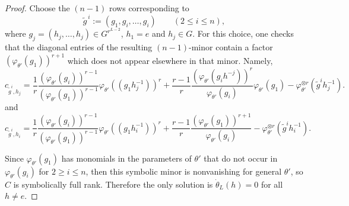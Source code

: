 \documentclass[10pt,a4paper]{amsart}
\begin{document}
\begin{proof}
Choose the $(n-1)$ rows corresponding to
\[
\tilde g^{\,i}:=(g_1, g_i,\dots,g_i)\qquad(2\le i\le n),
\]
where $g_j=(h_j,\dots,h_j)\in G^{r^{L-2}}$, $h_1=e$ and $h_j \in G$. For this choice, one checks that the diagonal entries of the resulting $(n-1)$-minor contain a factor $(\varphi_{\theta'}(g_1))^{r+1}$ which does not appear elsewhere in that minor. 
Namely,
 \[
 c_{\tilde{g}^i, h_j} = \dfrac{1}{r}\dfrac{(\varphi_{\theta'}(g_i))^{r-1}}{(\varphi_{\theta'}(g_1))^{r-1}} \varphi_{\theta'}((g_1    h_j^{-1}))^r 
 + 
 \dfrac{r-1}{r}\dfrac{(\varphi_{\theta'}(g_i   h^{-j}))^r}{\varphi_{\theta'}(g_i)} \varphi_{\theta'}(g_1) 
 - 
 \varphi_{\theta'}^{\otimes r}(\tilde{g}^{i}    h_j^{-1}).
 \]
and 
 \[
 c_{\tilde{g}^i, h_i} = \dfrac{1}{r}\dfrac{(\varphi_{\theta'}(g_i))^{r-1}}{(\varphi_{\theta'}(g_1))^{r-1}} \varphi_{\theta'}((g_1    h_i^{-1}))^r 
 + 
 \dfrac{r-1}{r}\dfrac{(\varphi_{\theta'}(g_1))^{r+1}}{\varphi_{\theta'}(g_i)}
 - 
 \varphi_{\theta'}^{\otimes r}(\tilde{g}^{i}    h_i^{-1}).
 \]

Since $\varphi_{\theta'}(g_1)$ has monomials in the parameters of $\theta'$ that do not occur  in  $\varphi_{\theta'}(g_i)$ for $2 \geq i \leq n$, then this symbolic minor is nonvanishing for general $\theta'$, so $C$ is symbolically full rank. Therefore the only solution is $\dot\theta_L(h)=0$ for all $h\ne e$. 
\end{proof}
\end{document}
